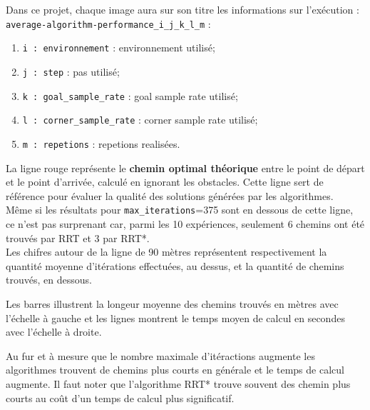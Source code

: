 \documentclass[../CSC_5RO16_TA_TP2.tex]{subfiles}
\begin{document}
\begin{remark}
    Dans ce projet, chaque image aura sur son titre les informations sur l'exécution : \texttt{average-algorithm-performance\_i\_j\_k\_l\_m} :
    \begin{enumerate}[noitemsep]
        \item \texttt{i : environnement} : environnement utilisé;
        \item \texttt{j : step} : pas utilisé;
        \item \texttt{k : goal\_sample\_rate} : goal sample rate utilisé;
        \item \texttt{l : corner\_sample\_rate} : corner sample rate utilisé;
        \item \texttt{m : repetions} : repetions realisées.
    \end{enumerate}
\end{remark}
\noindent La ligne rouge représente le \textbf{chemin optimal théorique} entre le point de départ et le point d'arrivée, calculé en ignorant les obstacles. Cette ligne sert de référence pour évaluer la qualité des solutions générées par les algorithmes.\\

\noindent Même si les résultats pour \texttt{max\_iterations}=375 sont en dessous de cette ligne, ce n'est pas surprenant car, parmi les 10 expériences, seulement 6 chemins ont été trouvés par \textcolor{graph_blue}{RRT} et 3 par \textcolor{graph_orange}{RRT*}.\\

\noindent Les chifres autour de la ligne de 90 mètres représentent respectivement la quantité moyenne d'itérations effectuées, au dessus, et la quantité de chemins trouvés, en dessous.
\begin{remark}
    Les barres illustrent la longeur moyenne des chemins trouvés en mètres avec l'échelle à gauche et les lignes montrent le temps moyen de calcul en secondes avec l'échelle à droite.
\end{remark}
\noindent Au fur et à mesure que le nombre maximale d'itéractions augmente les algorithmes trouvent de chemins plus courts en générale et le temps de calcul augmente. Il faut noter que l'algorithme \textcolor{graph_orange}{RRT*} trouve souvent des chemin plus courts au coût d'un temps de calcul plus significatif.
\end{document}

